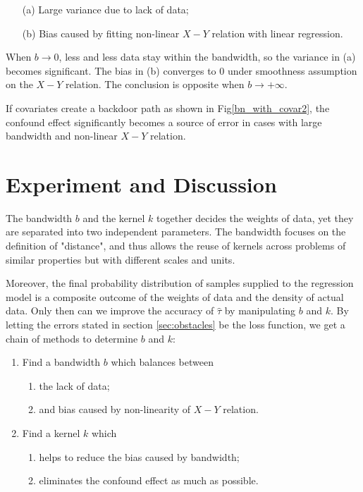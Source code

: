 \documentclass[a4 paper,12pt]{article}
\begin{document}
\begin{enumerate}
   \item[(a)] Large variance due to lack of data;
   \item[(b)] Bias caused by fitting non-linear $X-Y$ relation with linear regression.
\end{enumerate}

When $b\to 0$, less and less data stay within the bandwidth, so the variance in (a) becomes significant. The bias in (b) converges to $0$ under smoothness assumption on the $X-Y$ relation. The conclusion is opposite when $b\to+\infty$.

If covariates create a backdoor path as shown in Fig\ref{bn_with_covar2}, the confound effect significantly becomes a source of error in cases with large bandwidth and non-linear $X-Y$ relation.

\section{Experiment and Discussion}

The bandwidth $b$ and the kernel $k$ together decides the weights of data,
yet they are separated into two independent parameters.
The bandwidth focuses on the definition of "distance",
and thus allows the reuse of kernels across problems of similar properties but with different scales and units.

Moreover, the final probability distribution of samples supplied to the regression model is a composite outcome of the weights of data and the density of actual data.
Only then can we improve the accuracy of $\hat\tau$ by manipulating $b$ and $k$.
By letting the errors stated in section \ref{sec:obstacles} be the loss function, we get a chain of methods to determine $b$ and $k$:
\begin{enumerate}
   \item Find a bandwidth $b$ which balances between
   \begin{enumerate}
      \item the lack of data;
      \item and bias caused by non-linearity of $X-Y$ relation.
   \end{enumerate}
   \item Find a kernel $k$ which
   \begin{enumerate}
      \item helps to reduce the bias caused by bandwidth;
      \item eliminates the confound effect as much as possible.
   \end{enumerate}
\end{enumerate}
\end{document}
